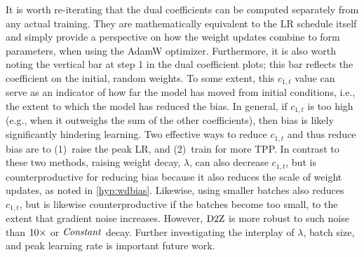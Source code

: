 It is worth re-iterating that the dual coefficients can be computed
separately from any actual training.  They are mathematically
equivalent to the LR schedule itself and simply provide a perspective
on how the weight updates combine to form parameters, when using the
AdamW optimizer.
%
Furthermore, it is also worth noting the vertical bar at step 1 in the
dual coefficient plots; this bar reflects the coefficient on the
initial, random weights.
%
To some extent, this $c_{1,t}$ value can serve as an indicator of how
far the model has moved from initial conditions, i.e., the extent to
which the model has reduced the bias.  In general, if $c_{1,t}$ is too
high (e.g., when it outweighs the sum of the other coefficients), then
bias is likely significantly hindering learning.
%
Two effective ways to reduce $c_{1,t}$ and thus reduce bias are to
(1)~raise the peak LR, and (2)~train for more TPP\@.
%
In contrast to these two methods, raising weight decay, $\lambda$, can
also decrease $c_{1,t}$, but is counterproductive for reducing bias
because it also reduces the scale of weight updates, as noted in
\cref{hyp:wdbias}.  Likewise, using smaller batches also reduces
$c_{1,t}$, but is likewise counterproductive if the batches become too
small, to the extent that gradient noise increases.  However, $\mbox{D2Z}$
is more robust to such noise than $\mbox{10}\times$ or $\mbox{\emph{Constant}}$ decay.
Further investigating the interplay of $\lambda$, batch size, and
peak learning rate is important future work.
